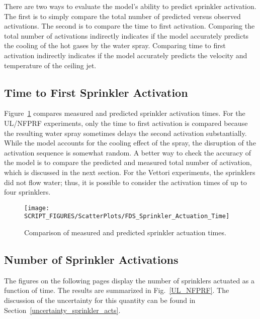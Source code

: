 There are two ways to evaluate the model's ability to predict sprinkler activation. The first is to simply compare the total number of predicted versus observed activations. The second is to compare the time to first activation. Comparing the total number of activations indirectly indicates if the model accurately predicts the cooling of the hot gases by the water spray. Comparing time to first activation indirectly indicates if the model accurately predicts the velocity and temperature of the ceiling jet.

\subsection{Time to First Sprinkler Activation}
\label{Sprinkler Activation Time}

Figure~\ref{Sprinkler_Activation_Times} compares measured and predicted sprinkler activation times. For the UL/NFPRF experiments, only the time to first activation is compared because the resulting water spray sometimes delays the second activation substantially. While the model accounts for the cooling effect of the spray, the disruption of the activation sequence is somewhat random. A better way to check the accuracy of the model is to compare the predicted and measured total number of activation, which is discussed in the next section. For the Vettori experiments, the sprinklers did not flow water; thus, it is possible to consider the activation times of up to four sprinklers.

\begin{figure}[h]
\begin{center}
\texttt{[image: SCRIPT\_FIGURES/ScatterPlots/FDS\_Sprinkler\_Actuation\_Time]}
\end{center}
\caption[Comparison of measured and predicted sprinkler actuation times]{Comparison of measured and predicted sprinkler actuation times.}
\label{Sprinkler_Activation_Times}
\end{figure}


\clearpage

\subsection{Number of Sprinkler Activations}
\label{UL_NFPRF:Results}
\label{Sprinkler Actuations}

The figures on the following pages display the number of sprinklers actuated as a function of time. The results are summarized in Fig.~\ref{UL_NFPRF}. The discussion of the uncertainty for this quantity can be found in Section~\ref{uncertainty_sprinkler_acts}.

